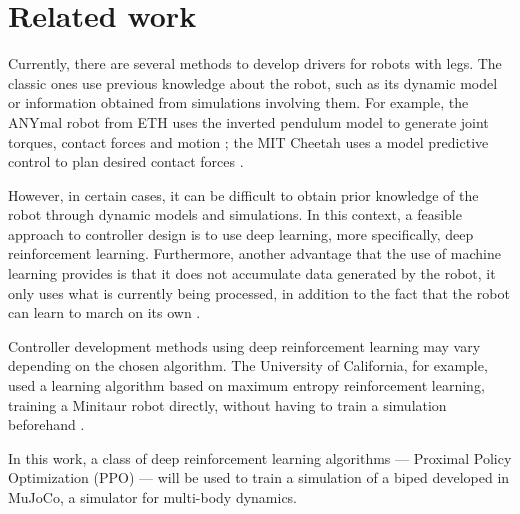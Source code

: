 \section{Related work}

Currently, there are several methods to develop drivers for robots with legs. The classic ones use previous knowledge about the robot, such as its dynamic model or information obtained from simulations involving them. For example, the ANYmal robot from ETH uses the inverted pendulum model to generate joint torques, contact forces and motion \cite{anymal}; the MIT Cheetah uses a model predictive control to plan desired contact forces \cite{cheetah}.

However, in certain cases, it can be difficult to obtain prior knowledge of the robot through dynamic models and simulations. In this context, a feasible approach to controller design is to use deep learning, more specifically, deep reinforcement learning. Furthermore, another advantage that the use of machine learning provides is that it does not accumulate data generated by the robot, it only uses what is currently being processed, in addition to the fact that the robot can learn to march on its own \cite{haarnoja2018learning}.

Controller development methods using deep reinforcement learning may vary depending on the chosen algorithm. The University of California, for example, used a learning algorithm based on maximum entropy reinforcement learning, training a Minitaur robot directly, without having to train a simulation beforehand \cite{haarnoja2018learning}.

In this work, a class of deep reinforcement learning algorithms — Proximal Policy Optimization (PPO) — will be used to train a simulation of a biped developed in MuJoCo, a simulator for multi-body dynamics.
